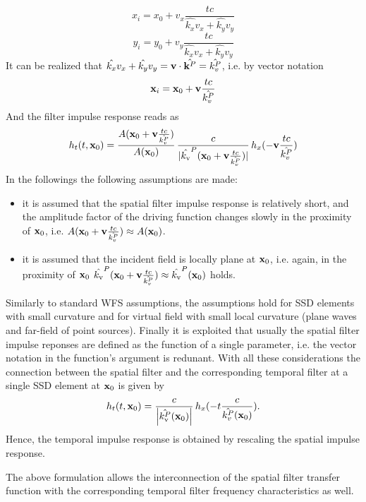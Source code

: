 \documentclass[12pt,a4paper]{article}
\begin{document}
\begin{equation}
    x_i = x_0 + v_x\frac{t c}{\hat{k_x}v_x+ \hat{k_y} v_y } 
\end{equation}
\begin{equation}
    y_i = y_0 + v_y\frac{t c}{\hat{k_x} v_x  + \hat{k_y}v_y} 
\end{equation}
It can be realized that $\hat{k_x} v_x  + \hat{k_y}v_y = \mathbf{v} \cdot \hat{\mathbf{k}^P} = \hat{k_v^P}$, i.e. by vector notation
\begin{equation}
    \mathbf{x}_i = \mathbf{x}_0 + \mathbf{v} \frac{t c}{\hat{k_v^P}} 
\end{equation}
And the filter impulse response reads as
\begin{equation}
    h_t(t, \mathbf{x}_0)  = \frac{A( \mathbf{x}_0 + \mathbf{v} \frac{t c}{\hat{k_v^P}}) }{ A(\mathbf{x}_0) }  \,
    \frac{c}{| \hat{k_\mathrm{v}}^P( \mathbf{x}_0 + \mathbf{v} \frac{t c}{\hat{k_v^P}})  |} \,
     h_x(-\mathbf{v} \frac{t c}{\hat{k_v^P}})
\end{equation}
In the followings the following assumptions are made:
\begin{itemize}
    \item it is assumed that the spatial filter impulse response is relatively short, and the amplitude factor of the driving function changes slowly in the proximity of $\mathbf{x}_0$, i.e.
$A( \mathbf{x}_0 + \mathbf{v} \frac{t c}{\hat{k_v^P}}) \approx A(\mathbf{x}_0)$.
    \item it is assumed that the incident field is locally plane at $\mathbf{x}_0$, i.e. again, in the proximity of $\mathbf{x}_0$ $\hat{k_\mathrm{v}}^P( \mathbf{x}_0 + \mathbf{v} \frac{t c}{\hat{k_v^P}}) \approx  \hat{k_\mathrm{v}}^P( \mathbf{x}_0)$ holds.
\end{itemize}
Similarly to standard WFS assumptions, the assumptions hold for SSD elements with small curvature and for virtual field with small local curvature (plane waves and far-field of point sources). 
Finally it is exploited that usually the spatial filter impulse reponses are defined as the function of a single parameter, i.e. the vector notation in the function's argument is redunant.
With all these considerations the connection between the spatial filter and the corresponding temporal filter at a single SSD element at $\mathbf{x}_0$ is given by 
\begin{equation}
    h_t(t, \mathbf{x}_0)  = \frac{c}{\left| \hat{k_\mathrm{v}^P}( \mathbf{x}_0 ) \right| } \,
     h_x(-t \frac{c}{\hat{k_v^P}(\mathbf{x}_0)}).
\end{equation}
Hence, the temporal impulse response is obtained by rescaling the spatial impulse response.

\vspace{3mm}
The above formulation allows the interconnection of the spatial filter transfer function with the corresponding temporal filter frequency characteristics as well.
\end{document}
